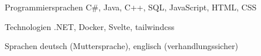 
\begin{cvskills}
  \cvskill
  {Programmiersprachen} %
  {C\#, Java, C++, SQL, JavaScript, HTML, CSS} %

  \cvskill
  {Technologien} %
  {.NET, Docker, Svelte, tailwindcss} %

  \cvskill
  {Sprachen} %
  {deutsch (Muttersprache), englisch (verhandlungssicher)} %
\end{cvskills}
